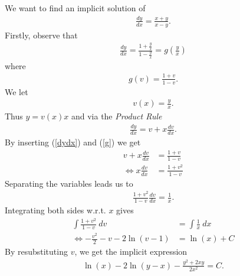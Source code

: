 \documentclass{article}
\begin{document}
We want to find an implicit solution of
\begin{align*}
    \frac{dy}{dx}=\frac{x+y}{x-y}.
\end{align*}
Firstly, observe that
\begin{align}
    \label{dydx}
    \frac{dy}{dx}=\frac{1+\frac{y}{x}}{1-\frac{y}{x}} = g\left(\frac{y}{x}\right)
\end{align}
where
\begin{align}
    \label{g}
    g(v) = \frac{1+v}{1-v}.
\end{align}
We let
\begin{align*}
    v(x)=\frac{y}{x}.
\end{align*}
Thus $y = v(x)x$ and via the \emph{Product Rule}
\begin{align*}
    \frac{dy}{dx}=v+x\frac{dv}{dx}.
\end{align*}
By inserting (\ref{dydx}) and (\ref{g}) we get
\begin{align*}
    v+x\frac{dv}{dx} &= \frac{1+v}{1-v}\\
    \Leftrightarrow x\frac{dv}{dx} &= \frac{1+v^2}{1-v}
\end{align*}
Separating the variables leads us to
\begin{align*}
    \frac{1+v^2}{1-v}\frac{dv}{dx} = \frac{1}{x}.
\end{align*}
Integrating both sides w.r.t. $x$ gives
\begin{align*}
    \int \frac{1+v^2}{1-v}\:dv &= \int \frac{1}{x}\: dx\\
    \Leftrightarrow -\frac{v^2}{2}-v-2\ln(v-1) &= \ln(x)+C
\end{align*}
By resubstituting $v$, we get the implicit expression
\begin{align*}
    \ln(x)-2\ln(y-x)-\frac{y^2+2xy}{2x^2} = C.
\end{align*}
\end{document}
